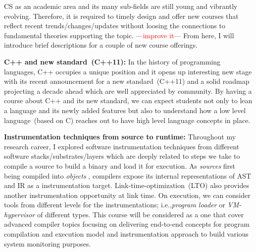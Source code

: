 \documentclass[letterpaper, 10pt]{article}
\newcommand{\jikk}[1]{{---\textcolor{red}{#1}---}}
\newcommand{\jikk}[1]{}
\def\ie{i.e.,\xspace}
\begin{document}
\begin{small}
CS as an academic area and its many sub-fields are still young and vibrantly
evolving. Therefore, it is required to timely design and offer new courses that
reflect recent trends/changes/updates without loosing the connections to
fundamental theories supporting the topic. \jikk{improve it} From here, I will
introduce brief descriptions for a couple of new course offerings.
%

{\bf C++ and new standard~(C++11):} In the history of programming languages, C++
occupies a unique position and it opens up interesting new stage with its
recent announcement for a new standard~(C++11) and a solid roadmap projecting a
decade ahead which are well appreciated by community.
%
%
By having a course about C++ and its new standard, we can expect students not
only to lean a language and its newly added features but also to understand how
a low level language~(based on C) reaches out to have high level language
concepts in place. 

{\bf Instrumentation techniques from source to runtime:} 
Throughout my research career, I explored software instrumentation techniques
from different software stacks/substrates/layers which are deeply related to
steps we take to compile a source to build a binary and load it for execution. 
%
As {\it sources} first being compiled into {\it objects} , compilers expose its
internal representations of AST and IR as a instrumentation target.
%
Link-time-optimization~(LTO) also provides another instrumentation opportunity
at link time. %
%
On execution, we can consider tools from different levels for the
instrumentations; \ie {\it program loader} or {\it VM-hypervisor} of different
types.
%
This course will be considered as a one that cover advanced compiler topics
focusing on delivering end-to-end concepts for program compilation and
execution model and instrumentation approach to build various system monitoring
purposes.


\end{small}
\end{document}
